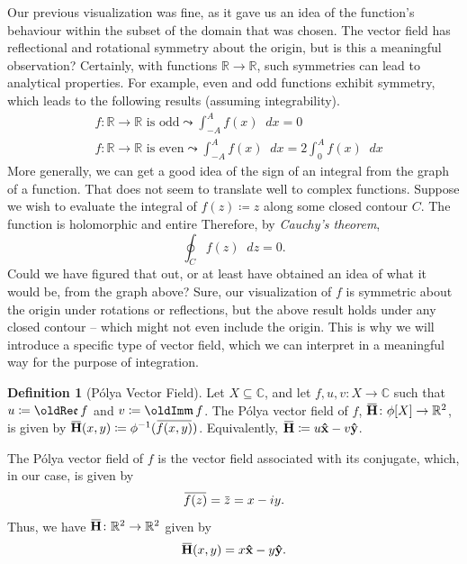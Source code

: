 \documentclass[a4paper]{article}
\newcommand*\diff{\mathop{}\!d} %
\newcommand{\R}{\mathbb{R}}
\newcommand{\C}{\mathbb{C}}
\renewcommand{\Im}{\mathop{\oldIm\mathfrak{m}}}
\renewcommand{\Re}{\mathop{\oldRe\mathfrak{e}}}
\newcommand{\overbar}[1]{\mkern 1.5mu\overline{\mkern-1.5mu#1\mkern-1.5mu}\mkern 1.5mu}
\theoremstyle{definition}
\newtheorem{definition}{Definition}
\begin{document}
Our previous visualization was fine, as it gave us an idea of the function's behaviour within the subset of the domain that was chosen.
The vector field has reflectional and rotational symmetry about the origin, but is this a meaningful observation?
Certainly, with functions $\R \to \R$, such symmetries can lead to analytical properties.
For example, even and odd functions exhibit symmetry, which leads to the following results (assuming integrability).
\begin{align*}
     & f \colon \R \to \R \text{ is odd} \leadsto \int_{-A}^{A} f(x) \diff x = 0                            \\
     & f \colon \R \to \R \text{ is even} \leadsto \int_{-A}^{A} f(x) \diff x = 2 \int_{0}^{A} f(x) \diff x
\end{align*}
More generally, we can get a good idea of the sign of an integral from the graph of a function.
That does not seem to translate well to complex functions.
Suppose we wish to evaluate the integral of $f(z) \coloneq z$ along some closed contour $C$.
The function is holomorphic and entire
Therefore, by \emph{Cauchy's theorem},
\begin{equation*}
    \oint_C f(z) \diff z = 0.
\end{equation*}
Could we have figured that out, or at least have obtained an idea of what it would be, from the graph above?
Sure, our visualization of $f$ is symmetric about the origin under rotations or reflections, but the above result holds under any closed contour -- which might not even include the origin.
This is why we will introduce a specific type of vector field, which we can interpret in a meaningful way for the purpose of integration.
\begin{definition}[P\'olya Vector Field]
    Let $X \subseteq \C$, and let $f,u,v \colon X \to \C$ such that $u \coloneq \Re f$ and $v \coloneq \Im f$.
    The P\'olya vector field of $f$, $\mathbf{\overbar{H}} \colon \phi[X] \to \R^2$, is given by $\mathbf{\overbar{H}} (x,y) \coloneq \phi^{-1}(\overbar{f(x,y)})$.
    Equivalently, $\mathbf{\overbar{H}} \coloneq u\mathbf{\hat{x}} - v\mathbf{\hat{y}}$.
\end{definition}
The P\'olya vector field of $f$ is the vector field associated with its conjugate, which, in our case, is given by
\begin{equation*}
    \overbar{f(z)} = \overbar{z} = x - iy.
\end{equation*}
Thus, we have $\mathbf{\overbar{H}} \colon \R^2 \to \R^2$ given by
\begin{equation*}
    \mathbf{\overbar{H}}(x,y) = x \mathbf{\hat{x}} - y \mathbf{\hat{y}}.
\end{equation*}
\end{document}
